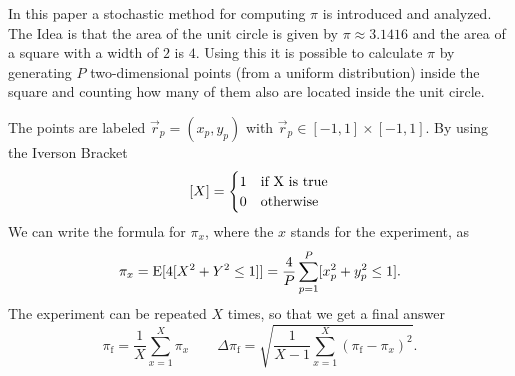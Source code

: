 In this paper a stochastic method for computing $\pi$ is introduced and analyzed.
The Idea is that the area of the unit circle is given by $\pi\approx 3.1416$ and the area of a square
with a width of $2$ is $4$. Using this it is possible to calculate $\pi$ by generating
$P$ two-dimensional points (from a uniform distribution) inside the square and counting how many of them also
are located inside the unit circle.\par
The points are labeled $\vec r_p = (x_p, y_p)$ with $\vec r_p \in [-1, 1]\times [-1 ,1]$.
By using the Iverson Bracket
\[
	[X] = \begin{cases}
		1 & \text{if X is true} \\
		0 & \mathrm{otherwise}
	\end{cases}
\]
We can write the formula for $\pi_x$, where the $x$ stands for the experiment, as
\begin{equation}
	\pi_x = \text{E}[4[X^2 + Y^2 \leq 1]] = \frac{4}{P}\sum_{p = 1}^P [x_p^2 + y_p^2 \leq 1].
	\label{eq:pi}
\end{equation}
The experiment can be repeated $X$ times, so that we get a final answer
\begin{equation}
	\pi_\mathrm f = \frac{1}{X}\sum_{x = 1}^X \pi_x \qquad
	\Delta \pi_\mathrm f = \sqrt{\frac{1}{X-1}\sum_{x=1}^X (\pi_\mathrm f - \pi_x)^2}.
	\label{eq:pi_final}
\end{equation}